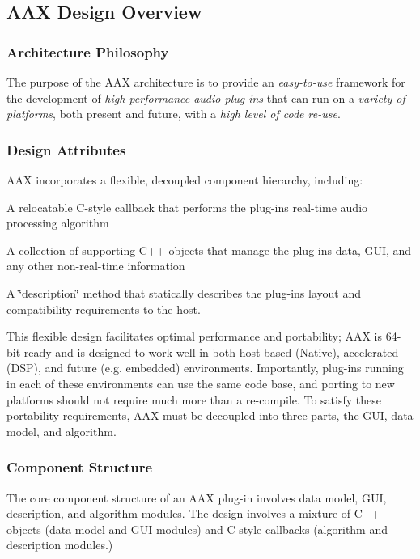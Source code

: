  \hypertarget{a00794_aax_sdk_guide_01_aax_design_overview}{}\subsection{A\+A\+X Design Overview}\label{a00794_aax_sdk_guide_01_aax_design_overview}
\hypertarget{a00794_subsection__architecture_philosophy}{}\subsubsection{Architecture Philosophy}\label{a00794_subsection__architecture_philosophy}
The purpose of the A\+AX architecture is to provide an {\itshape easy-\/to-\/use} framework for the development of {\itshape high-\/performance audio plug-\/ins} that can run on a {\itshape variety of platforms}, both present and future, with a {\itshape high level of code re-\/use}.

\hypertarget{a00794_subsection__design_attributes}{}\subsubsection{Design Attributes}\label{a00794_subsection__design_attributes}
A\+AX incorporates a flexible, decoupled component hierarchy, including\+: 
\begin{DoxyEnumerate}
\item A relocatable C-\/style callback that performs the plug-\/in\textquotesingle{}s real-\/time audio processing algorithm  
\item A collection of supporting C++ objects that manage the plug-\/in\textquotesingle{}s data, G\+UI, and any other non-\/real-\/time information  
\item A \char`\"{}description\char`\"{} method that statically describes the plug-\/in\textquotesingle{}s layout and compatibility requirements to the host.  
\end{DoxyEnumerate}

This flexible design facilitates optimal performance and portability; A\+AX is 64-\/bit ready and is designed to work well in both host-\/based (Native), accelerated (D\+SP), and future (e.\+g. embedded) environments. Importantly, plug-\/ins running in each of these environments can use the same code base, and porting to new platforms should not require much more than a re-\/compile. To satisfy these portability requirements, A\+AX must be decoupled into three parts, the G\+UI, data model, and algorithm.

\hypertarget{a00794_subsection__component_structure}{}\subsubsection{Component Structure}\label{a00794_subsection__component_structure}
The core component structure of an A\+AX plug-\/in involves data model, G\+UI, description, and algorithm modules. The design involves a mixture of C++ objects (data model and G\+UI modules) and C-\/style callbacks (algorithm and description modules.)

